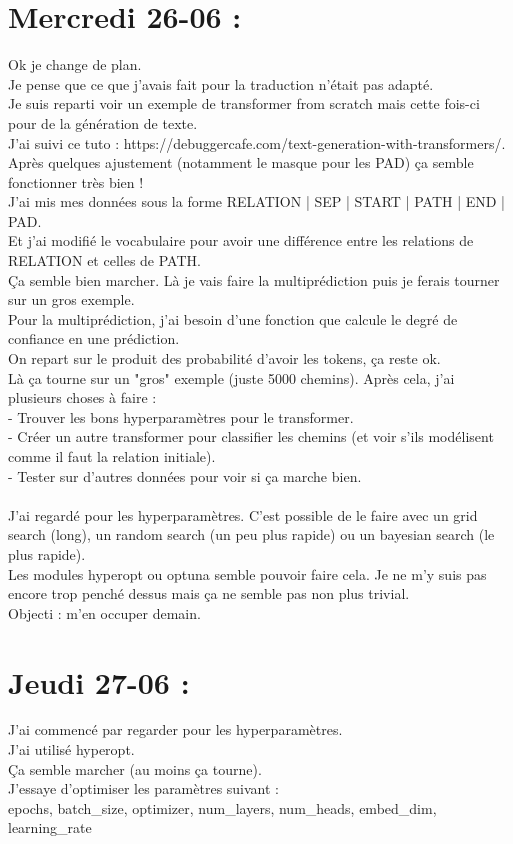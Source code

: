 \documentclass{article}
\begin{document}
\section*{Mercredi 26-06 :}
Ok je change de plan.\\
Je pense que ce que j'avais fait pour la traduction n'était pas adapté.\\
Je suis reparti voir un exemple de transformer from scratch mais cette fois-ci pour de la génération de texte.\\
J'ai suivi ce tuto : https://debuggercafe.com/text-generation-with-transformers/.\\
Après quelques ajustement (notamment le masque pour les PAD) ça semble fonctionner très bien !\\
J'ai mis mes données sous la forme RELATION | SEP | START | PATH | END | PAD.\\
Et j'ai modifié le vocabulaire pour avoir une différence entre les relations de RELATION et celles de PATH.\\
Ça semble bien marcher. Là je vais faire la multiprédiction puis je ferais tourner sur un gros exemple.\\
Pour la multiprédiction, j'ai besoin d'une fonction que calcule le degré de confiance en une prédiction.\\
On repart sur le produit des probabilité d'avoir les tokens, ça reste ok.\\
Là ça tourne sur un "gros" exemple (juste 5000 chemins). Après cela, j'ai plusieurs choses à faire :\\
- Trouver les bons hyperparamètres pour le transformer.\\
- Créer un autre transformer pour classifier les chemins (et voir s'ils modélisent comme il faut la relation initiale).\\
- Tester sur d'autres données pour voir si ça marche bien.\\\\
J'ai regardé pour les hyperparamètres. C'est possible de le faire avec un grid search (long), un random search (un peu plus rapide) ou un bayesian search (le plus rapide).\\
Les modules hyperopt ou optuna semble pouvoir faire cela. Je ne m'y suis pas encore trop penché dessus mais ça ne semble pas non plus trivial.\\
Objecti : m'en occuper demain.\\
\section*{Jeudi 27-06 :}
J'ai commencé par regarder pour les hyperparamètres.\\
J'ai utilisé hyperopt.\\
Ça semble marcher (au moins ça tourne).\\
J'essaye d'optimiser les paramètres suivant :\\
epochs, batch\_size, optimizer, num\_layers, num\_heads, embed\_dim, learning\_rate\\
\end{document}
